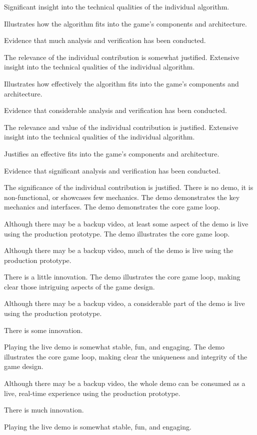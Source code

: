 \documentclass{../../fal_assignment}
\begin{document}
\begin{markingrubric}
        \grade Significant insight into the technical qualities of the individual algorithm.
            \par Illustrates how the algorithm fits into the game's components and architecture.
            \par Evidence that much analysis and verification has been conducted.
            \par The relevance of the individual contribution is somewhat justified.
        \grade Extensive insight into the technical qualities of the individual algorithm.
            \par Illustrates how effectively the algorithm fits into the game's components and architecture.
            \par Evidence that considerable analysis and verification has been conducted.
            \par The relevance and value of the individual contribution is justified.
        \grade Extensive insight into the technical qualities of the individual algorithm.
            \par Justifies an effective fits into the game's components and architecture.
            \par Evidence that significant analysis and verification has been conducted.
            \par The significance of the individual contribution is justified.
%
        \grade\fail There is no demo, it is non-functional, or showcases few mechanics.
        \grade The demo demonstrates the key mechanics and interfaces.
        \grade The demo demonstrates the core game loop.
            \par Although there may be a backup video, at least some aspect of the demo is live using the production prototype.
        \grade The demo illustrates the core game loop.
            \par Although there may be a backup video, much of the demo is live using the production prototype.
            \par There is a little innovation.
        \grade The demo illustrates the core game loop, making clear those intriguing aspects of the game design.
            \par Although there may be a backup video, a considerable part of the demo is live using the production prototype.
            \par There is some innovation.
            \par Playing the live demo is somewhat stable, fun, and engaging.
        \grade The demo illustrates the core game loop, making clear the uniqueness and integrity of the game design.
            \par Although there may be a backup video, the whole demo can be consumed as a live, real-time experience using the production prototype.
            \par There is much innovation.
            \par Playing the live demo is somewhat stable, fun, and engaging.
\end{markingrubric}
\end{document}

